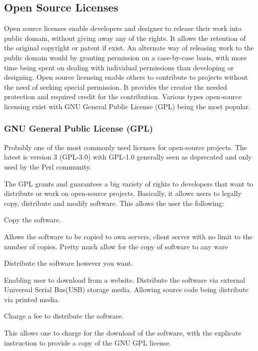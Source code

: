 \documentclass[12pt, onecolumn]{witseiepaper}
\begin{document}
\subsection{Open Source Licenses}

Open source licenses enable developers and designer to release their work into public domain, without giving away any of the rights.  It allows the retention of the original copyright or patent if exist.  An alternate way of releasing work to the public domain would by granting permission on a case-by-case basis, with more time being spent on dealing with individual permissions than developing or designing.  Open source licensing enable others to contribute to projects without the need of seeking special permission.  It provides the creator the needed protection and required credit for the contribution.  Various types open-source licensing exist with GNU General Public License (GPL) being the most popular.

\subsubsection{GNU General Public License (GPL)}

Probably one of the most commonly used licenses for open-source projects.  The latest is version 3 (GPL-3.0) with GPL-1.0 generally seen as deprecated and only used by the Perl community. \cite{GPL} 

The GPL grants and guarantees a big variety of rights to developers that want to distribute or work on open-source projects. Basically, it allows users to legally copy, distribute and modify software.  This allows the user the following:

\textbullet \space Copy the software.

Allows the software to be copied to own servers, client server with no limit to the number of copies.  Pretty much allow for the copy of software to any ware

\textbullet \space Distribute the software however you want.

Enabling user to download from a website.  Distribute the software via external Universal Serial Bus(USB) storage media.  Allowing source code being distribute via printed media.

\textbullet \space Charge a fee to distribute the software.

This allows one to charge for the download of the software, with the explicate instruction to provide a copy of the GNU GPL license.
\end{document}

